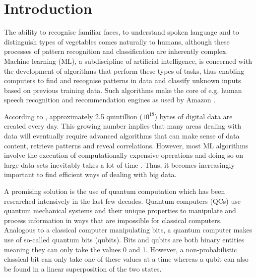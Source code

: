 \chapter{Introduction}\label{sec:introduction}

The ability to recognise familiar faces, to understand spoken language and to distinguish types of vegetables comes naturally to humans, although these processes of pattern recognition and classification are inherently complex. Machine learning (ML), a subdiscipline of artificial intelligence, is concerned with the development of algorithms that perform these types of tasks, thus enabling computers to find and recognise patterns in data and classify unknown inputs based on previous training data. Such algorithms make the core of e.g. human speech recognition and recommendation engines as used by Amazon \cite{graves2013speech,linden2003amazon}.

According to , approximately 2.5 quintillion (${10}^{18}$) bytes of digital data are created every day. This growing number implies that many areas dealing with data will eventually require advanced algorithms that can make sense of data content, retrieve patterns and reveal correlations. However, most ML algorithms involve the execution of computationally expensive operations and doing so on large data sets inevitably takes a lot of time \cite{bekkerman2011scaling}. Thus, it becomes increasingly important to find efficient ways of dealing with big data.

A promising solution is the use of quantum computation which has been researched intensively in the last few decades. Quantum computers (QCs) use quantum mechanical systems and their unique properties to manipulate and process information in ways that are impossible for classical computers. Analogous to a classical computer manipulating bits, a quantum computer makes use of so-called quantum bits (qubits). Bits and qubits are both binary entities meaning they can only take the values 0 and 1. However, a non-probabilistic classical bit can only take one of these values at a time whereas a qubit can also be found in a linear superposition of the two states.


